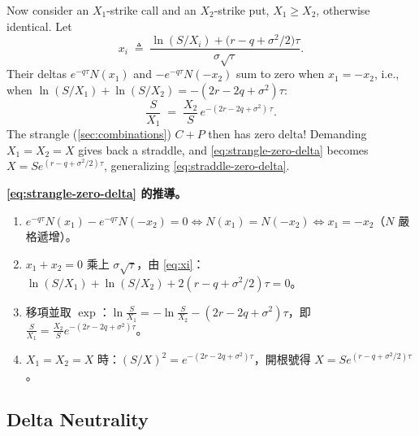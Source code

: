 Now consider an $X_{1}$-strike call and an $X_{2}$-strike put, $X_{1}\ge X_{2}$, otherwise identical.
Let
\begin{equation}
	x_{i} \;\triangleq\; \frac{\ln(S/X_{i})+\bigl(r-q+\sigma^{2}/2\bigr)\tau}{\sigma\sqrt{\tau}} .
	\label{eq:xi}
\end{equation}
Their deltas $e^{-q\tau}N(x_{1})$ and $-e^{-q\tau}N(-x_{2})$ sum to zero when $x_{1}=-x_{2}$, i.e., when $\ln(S/X_{1})+\ln(S/X_{2})=-(2r-2q+\sigma^{2})\tau$:
\begin{equation}
	\frac{S}{X_{1}} \;=\; \frac{X_{2}}{S}\,e^{-(2r-2q+\sigma^{2})\,\tau} .
	\label{eq:strangle-zero-delta}
\end{equation}
The strangle (\autoref{sec:combinations}) $C+P$ then has zero delta!
Demanding $X_{1}=X_{2}=X$ gives back a straddle, and \eqref{eq:strangle-zero-delta} becomes $X=Se^{(r-q+\sigma^{2}/2)\tau}$, generalizing \eqref{eq:straddle-zero-delta}.

\suppstart
{}

\begin{remark}[補充]
	\textbf{\eqref{eq:strangle-zero-delta} 的推導。}
	\begin{enumerate}[(1),nosep]
		\item $e^{-q\tau}N(x_{1})-e^{-q\tau}N(-x_{2})=0\iff N(x_{1})=N(-x_{2})\iff x_{1}=-x_{2}$（$N$ 嚴格遞增）。
		\item $x_{1}+x_{2}=0$ 乘上 $\sigma\sqrt{\tau}$，由 \eqref{eq:xi}：$\ln(S/X_{1})+\ln(S/X_{2})+2(r-q+\sigma^{2}/2)\tau=0$。
		\item 移項並取 $\exp$：$\ln\frac{S}{X_{1}}=-\ln\frac{S}{X_{2}}-(2r-2q+\sigma^{2})\tau$，即 $\frac{S}{X_{1}}=\frac{X_{2}}{S}e^{-(2r-2q+\sigma^{2})\tau}$。
		\item $X_{1}=X_{2}=X$ 時：$(S/X)^{2}=e^{-(2r-2q+\sigma^{2})\tau}$，開根號得 $X=Se^{(r-q+\sigma^{2}/2)\tau}$。
	\end{enumerate}
\end{remark}
\suppend

\subsection{Delta Neutrality}

